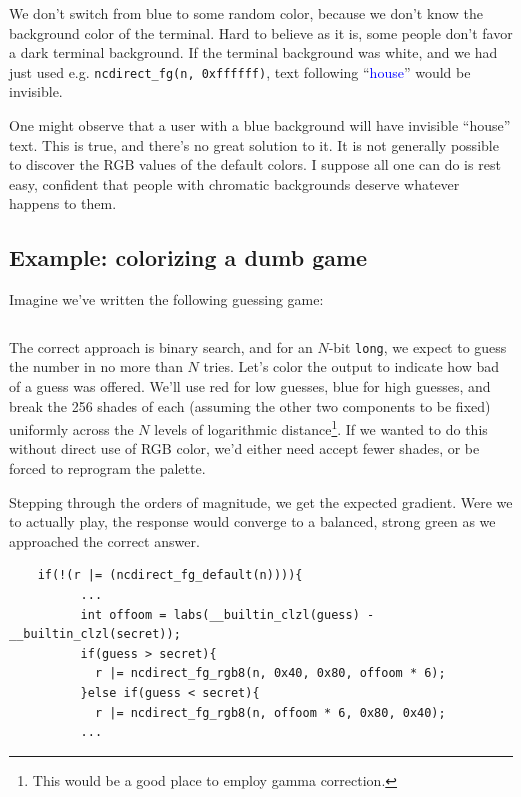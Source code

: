 \documentclass[letterpaper,10pt]{article}
\begin{document}
We don't switch from blue to some random color, because we don't know the
background color of the terminal. Hard to believe as it is, some people don't
favor a dark terminal background. If the terminal background was white, and we
had just used e.g. \texttt{ncdirect\_fg(n, 0xffffff)}, text following
``\textcolor{blue}{house}'' would be invisible.

One might observe that a user with a blue background will have invisible ``house'' text.
This is true, and there's no great solution to it. It is not generally possible to
discover the RGB values of the default colors. I suppose all one can do is rest easy,
confident that people with chromatic backgrounds deserve whatever happens to them.

\subsection{Example: colorizing a dumb game}

Imagine we've written the following guessing game:

\begin{listing}[ht]
\inputminted[fontsize=\scriptsize]{C}{code/hilostdio.c}
\end{listing}

The correct approach is binary search, and for an $N$-bit \texttt{long}, we expect to
guess the number in no more than $N$ tries. Let's color the output to indicate how
bad of a guess was offered. We'll use red for low guesses, blue for high
guesses, and break the 256 shades of each (assuming the other two components
to be fixed) uniformly across the $N$ levels of logarithmic
distance\footnote{This would be a good place to employ \gls{gamma correction}.}.
If we wanted to do this without direct use of RGB color, we'd either need
accept fewer shades, or be forced to reprogram the palette.

Stepping through the orders of magnitude, we get the expected gradient. Were
we to actually play, the response would converge to a balanced, strong green
as we approached the correct answer.

\begin{listing}[ht]
\begin{verbatim}
    if(!(r |= (ncdirect_fg_default(n)))){
          ...
          int offoom = labs(__builtin_clzl(guess) - __builtin_clzl(secret));
          if(guess > secret){
            r |= ncdirect_fg_rgb8(n, 0x40, 0x80, offoom * 6);
          }else if(guess < secret){
            r |= ncdirect_fg_rgb8(n, offoom * 6, 0x80, 0x40);
          ...
\end{verbatim}
\end{listing}
\end{document}
